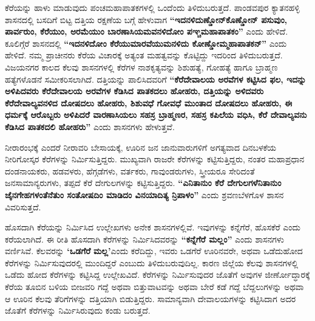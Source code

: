 ಕೆರೆಯನ್ನು ಹಾಳು ಮಾಡುವುದು ಪಂಚಮಹಾಪಾತಕಗಳಲ್ಲಿ ಒಂದೆಂದು ತಿಳಿದುಬರುತ್ತದೆ. ಪಾಂಡವಪುರ ಕ್ಯಾತನಹಳ್ಳಿ ಶಾಸನದಲ್ಲಿ ಬಸದಿಗೆ ಬಿಟ್ಟ ದತ್ತಿಯ ರಕ್ಷಣೆಯ ಬಗ್ಗೆ ಹೇಳುವಾಗ \textbf{“ಇದನಳಿದುಣ್ಡೋನ್​ ಕೊಣ್ಡೋನ್​ ಪಸುವುಂ, ಪಾರ್ವರುಂ, ಕೆರೆಯುಂ, ಅರಮೆಯುಂ ಬಾರಣಾಸಿಯಮವನಳಿದೋಂ ಪಞ್ಚಮಹಾಪಾತಕಂ”} ಎಂದು ಹೇಳಿದೆ. ಕೂಲಿಗ್ಗೆರೆ ಶಾಸನದಲ್ಲಿ \textbf{“ಇದನಳಿದೋಂ ಕೆರೆಯುಮಾರವೆಯುಮನಳಿದು ಕೋಣ್ಡೋಮ್ಮಹಾಪಾತಕನ್​”} ಎಂದು ಹೇಳಿದೆ. ನಮ್ಮ ಪ್ರಾಚೀನರು ಕೆರೆಯ ವಿಚಾರಕ್ಕೆ ಅತ್ಯಂತ ಮಹತ್ವವನ್ನು ಕೊಟ್ಟಿದ್ದು ಇದರಿಂದ ತಿಳಿದುಬರುತ್ತದೆ. ವಿಜಯನಗರ ಕಾಲದ ಕೆಲವು ಶಾಸನಗಳಲ್ಲಿ ಕೆರೆಗಳ ನಾಶಕೃತ್ಯವನ್ನು ಶಿಶುಹತ್ಯೆ, ಗೋಹತ್ಯೆ ಹಾಗೂ ಬ್ರಾಹ್ಮಣ ಹತ್ಯೆಗಳೊಡನೆ ಸಮೀಕರಿಸಲಾಗಿದೆ. ದತ್ತಿಯನ್ನು ಪಾಲಿಸಿದವರಿಗೆ \textbf{“ಕೆರೆದೇವಾಲಯ ಅರವೆಗಳ ಕಟ್ಟಿಸಿದ ಫಲ, ಇದನ್ನು ಅಳಿಪಿದವರು ಕೆರೆದೇವಾಲಯ ಅರವೆಗಳ ಕೆಡಿಸಿದ ಪಾತಕದಲು ಹೋಹರು, ದತ್ತಿಯನ್ನು ಅಳಿದವರು ಕೆರೆದೇವಾಲ್ಯವನಳಿದ ದೋಷದಲು ಹೋಹರು, ಶಿಶುವಧೆ ಗೋವಧೆ ಮುಂತಾದ ದೋಷದಲು ಹೋಹರು, ಈ ಧರ್ಮಕ್ಕೆ ಆರೊಬ್ಬರು ಅಳಿಪಿದರೆ ವಾರಣಾಸಿಯಲು ಸಹಸ್ರ ಬ್ರಾಹ್ಮಣರ, ಸಹಸ್ರ ಕಪಿಲೆಯ ವಧಿಸಿ, ಕೆರೆ ದೇವಾಲ್ಯವನು ಕೆಡಿಸಿದ ಪಾತಕದಲಿ ಹೋಹರು”} ಎಂದು ಶಾಸನಗಳು ಹೇಳುತ್ತವೆ.

ನೀರಾರಂಭಕ್ಕೆ ಎಂದರೆ ನೀರಾವರಿ ಬೇಸಾಯಕ್ಕೆ, ಊರಿನ ಜನ ಜಾನುವಾರುಗಳಿಗೆ ಅಗತ್ಯವಾದ ದಿನಬಳಕೆಯ ನೀರಿಗೋಸ್ಕರ ಕೆರೆಗಳನ್ನು ನಿರ್ಮಿಸುತ್ತಿದ್ದರು. ಮುಖ್ಯವಾಗಿ ರಾಜರೇ ಕೆರೆಗಳನ್ನು ಕಟ್ಟಿಸುತ್ತಿದ್ದರು, ನಂತರ ಮಹಾಪ್ರಧಾನ ದಂಡನಾಯಕರು, ಹಡವಳರು, ಹೆಗ್ಗಡೆಗಳು, ವರ್ತಕರು, ಗಾವುಂಡರುಗಳು, ಸ್ತ್ರೀಯರೂ ಸೇರಿದಂತೆ ಜನಸಾಮಾನ್ಯರುಗಳು, ತಪ್ಪದೆ ಕೆರೆ ದೇಗುಲಗಳನ್ನು ಕಟ್ಟಿಸುತ್ತಿದ್ದರು. \textbf{“ಎನಿತಾನುಂ ಕೆರೆ ದೇಗುಲಗಳೆನಿತಾನುಂ ಜೈನಗೇಹಗಳಂತೆನೆತುಂ ಸಂತೋಷದಿಂ ಮಾಡಿದಂ ವಿನಯಾದಿತ್ಯ ನ್ರಿಪಾಳಂ”} ಎಂದು ಶ್ರವಣಬೆಳಗೊಳ ಶಾಸನ ವಿವರಿಸುತ್ತದೆ.

ಹೊಸದಾಗಿ ಕೆರೆಯನ್ನು ನಿರ್ಮಿಸಿದ ಉಲ್ಲೇಖಗಳು ಅನೇಕ ಶಾಸನಗಳಲ್ಲಿವೆ. ಇವುಗಳನ್ನು ಕನ್ನೆಗೆರೆ, ಹೊಸಕೆರೆ ಎಂದು ಕರೆಯಲಾಗಿದೆ. ಈ ರೀತಿ ಹೊಸದಾಗಿ ಕೆರೆಗಳನ್ನು ನಿರ್ಮಿಸಿದವರನ್ನು \textbf{“ಕನ್ನೆಗೆರೆ ಮಲ್ಲಂ”} ಎಂದು ಶಾಸನಗಳು ವರ್ಣಿಸಿವೆ. ಕೆಲವರನ್ನು \textbf{‘ಒಡಗೆರೆ} \textbf{ಮಲ್ಲ’}ಎಂದು ಕರೆದಿದ್ದು, ಇವರು ಒಡಗೆರೆ ಊರಿನವರೇ, ಅಥವಾ ಒಡೆದುಹೋದ ಕೆರೆಗಳನ್ನು ನಿರ್ಮಿಸುವುದರಲ್ಲಿ ಮುಂದಿದ್ದರೆ ಎಂಬುದು ತಿಳಿದುಬರುವುದಿಲ್ಲ. ಕಾರಣ ಜಿಲ್ಲೆಯ ಕೆಲವು ಶಾಸನಗಳಲ್ಲಿ ಒಡೆದು ಹೋದ ಕೆರೆಗಳನ್ನು ಕಟ್ಟಿಸಿದ್ದ ಉಲ್ಲೇಖವಿದೆ. ಕೆರೆಗಳನ್ನು ನಿರ್ಮಿಸುವುದರ ಜೊತೆಗೆ ಅವುಗಳ ಜೀರ್ಣೋದ್ಧಾರಕ್ಕೆ ಕೆರೆಯ ತೂಬಿನ ಬಳಿಯ ಬೀಜವರಿ ಗದ್ದೆ ಅಥವಾ ಬಿತ್ತುವಾಟವನ್ನು ಅಥವಾ ಬೇರೆ ಕಡೆ ಗದ್ದೆ ಬೆದ್ದಲುಗಳನ್ನು ಅಥವಾ ಆ ಊರಿನ ಕೆಲವು ತೆರಿಗೆಗಳನ್ನು ದತ್ತಿಯಾಗಿ ಬಿಡುತ್ತಿದ್ದರು. ಸಾಮಾನ್ಯವಾಗಿ ದೇವಾಲಯಗಳನ್ನು ಕಟ್ಟಿಸಿದಾಗ ಅದರ ಜೊತೆಗೆ ಕೆರೆಗಳನ್ನು ನಿರ್ಮಿಸಿರುವುದು ಕಂಡು ಬರುತ್ತದೆ.

